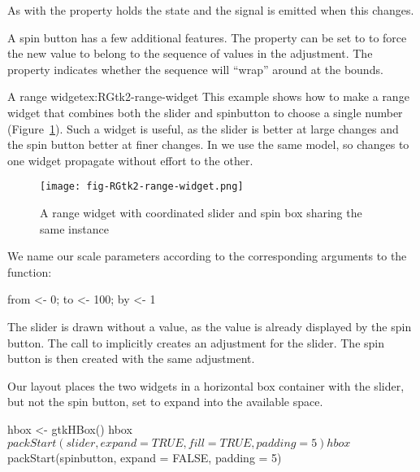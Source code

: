 As with  the  property holds the state and
the  signal is emitted when this changes.

A spin button has a few additional features. The property
 can be set to  to force the new value
to belong to the sequence of values in the adjustment. The 
property indicates whether the sequence will ``wrap'' around at the
bounds.

\begin{example}{A range widget}{ex:RGtk2-range-widget}
This example shows how to make a range widget that combines both the
slider and spinbutton to choose a single number
(Figure~\ref{fig:RGtk2-range-widget}). Such a widget is useful, as the
slider is better at large changes and the spin button better at finer
changes. In \GTK\/ we use the same  model, so
changes to one widget propagate without effort to the other.

\begin{figure}
  \centering
  \texttt{[image: fig-RGtk2-range-widget.png]}
  \caption{A range widget with coordinated slider and spin box sharing the same  instance}
  \label{fig:RGtk2-range-widget}
\end{figure}


We name our scale parameters according to the corresponding arguments
to the  function:
\begin{Schunk}
\begin{Sinput}
 from <- 0; to <- 100; by <- 1
\end{Sinput}
\end{Schunk}

The slider is drawn without a value, as the value is already displayed
by the spin button. The call to  implicitly
creates an adjustment for the slider. The spin button is then created
with the same adjustment.
\begin{Schunk}
\end{Schunk}
%
Our layout places the two widgets in a horizontal box container with
the slider, but not the spin button, set to expand into the available
space.
\begin{Schunk}
\begin{Sinput}
 hbox <- gtkHBox()
 hbox$packStart(slider, expand = TRUE, fill = TRUE, padding = 5)
 hbox$packStart(spinbutton, expand = FALSE, padding = 5)
\end{Sinput}
\end{Schunk}


\end{example}


